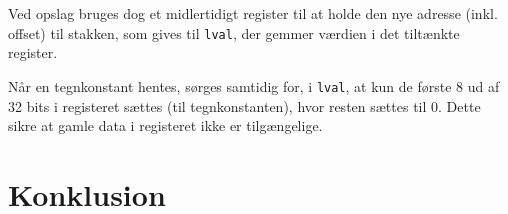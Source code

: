 \documentclass[a4paper, 10pt]{article}
\begin{document}
Ved opslag bruges dog et midlertidigt register til at holde den nye adresse
(inkl. offset) til stakken, som gives til \texttt{lval}, der gemmer værdien i
det tiltænkte register.

Når en tegnkonstant hentes, sørges samtidig for, i \texttt{lval}, at kun de
første 8 ud af 32 bits i registeret sættes (til tegnkonstanten), hvor resten
sættes til 0. Dette sikre at gamle data i registeret ikke er tilgængelige.

\section{Konklusion}
\end{document}
